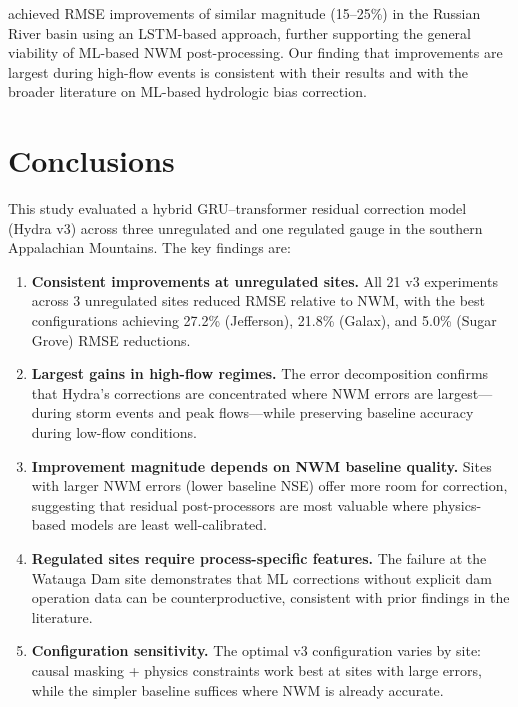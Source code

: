 \documentclass[draft]{agujournal2019}
\begin{document}
 achieved RMSE improvements of similar magnitude (15--25\%) in the Russian River basin using an LSTM-based approach, further supporting the general viability of ML-based NWM post-processing. Our finding that improvements are largest during high-flow events is consistent with their results and with the broader literature on ML-based hydrologic bias correction.


\section{Conclusions}

This study evaluated a hybrid GRU--transformer residual correction model (Hydra v3) across three unregulated and one regulated gauge in the southern Appalachian Mountains. The key findings are:

\begin{enumerate}
    \item \textbf{Consistent improvements at unregulated sites.} All 21 v3 experiments across 3 unregulated sites reduced RMSE relative to NWM, with the best configurations achieving 27.2\% (Jefferson), 21.8\% (Galax), and 5.0\% (Sugar Grove) RMSE reductions.

    \item \textbf{Largest gains in high-flow regimes.} The error decomposition confirms that Hydra's corrections are concentrated where NWM errors are largest---during storm events and peak flows---while preserving baseline accuracy during low-flow conditions.

    \item \textbf{Improvement magnitude depends on NWM baseline quality.} Sites with larger NWM errors (lower baseline NSE) offer more room for correction, suggesting that residual post-processors are most valuable where physics-based models are least well-calibrated.

    \item \textbf{Regulated sites require process-specific features.} The failure at the Watauga Dam site demonstrates that ML corrections without explicit dam operation data can be counterproductive, consistent with prior findings in the literature.

    \item \textbf{Configuration sensitivity.} The optimal v3 configuration varies by site: causal masking + physics constraints work best at sites with large errors, while the simpler baseline suffices where NWM is already accurate.
\end{enumerate}
\end{document}
